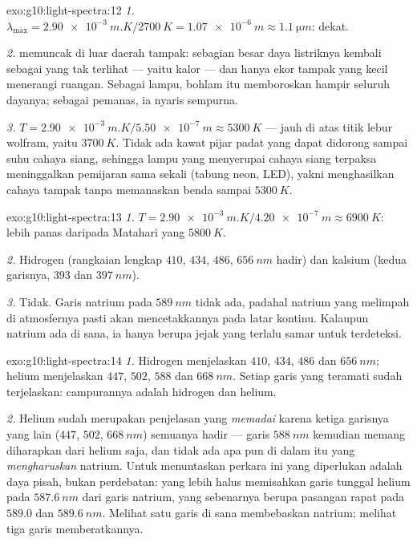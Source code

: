 \begin{solution}{exo:g10:light-spectra:12}
\emph{1.} $\lambda_{\max} = \qty{2.90e-3}{m.K} / \qty{2700}{K}
= \qty{1.07e-6}{m} \approx \qty{1.1}{\micro m}$:  dekat.

\emph{2.}  memuncak di luar daerah tampak: sebagian besar
daya listriknya kembali sebagai  yang tak terlihat --- yaitu
kalor --- dan hanya ekor tampak yang kecil menerangi ruangan. Sebagai
lampu, bohlam itu memboroskan hampir seluruh dayanya; sebagai pemanas,
ia nyaris sempurna.

\emph{3.} $T = \qty{2.90e-3}{m.K} / \qty{5.50e-7}{m} \approx
\qty{5300}{K}$ --- jauh di atas titik lebur wolfram, yaitu
$\qty{3700}{K}$. Tidak ada kawat pijar padat yang dapat didorong sampai
suhu cahaya siang, sehingga lampu yang menyerupai cahaya siang terpaksa
meninggalkan pemijaran sama sekali (tabung neon, LED), yakni
menghasilkan cahaya tampak tanpa memanaskan benda sampai
$\qty{5300}{K}$.
\end{solution}

\begin{solution}{exo:g10:light-spectra:13}
\emph{1.} $T = \qty{2.90e-3}{m.K} / \qty{4.20e-7}{m} \approx
\qty{6900}{K}$: lebih panas daripada Matahari yang $\qty{5800}{K}$.

\emph{2.} Hidrogen (rangkaian lengkap $410$, $434$, $486$,
$\qty{656}{nm}$ hadir) dan kalsium (kedua garisnya, $393$ dan
$\qty{397}{nm}$).

\emph{3.} Tidak. Garis natrium pada $\qty{589}{nm}$ tidak ada, padahal
natrium yang melimpah di atmosfernya pasti akan mencetakkannya pada
latar kontinu. Kalaupun natrium ada di sana, ia hanya berupa jejak yang
terlalu samar untuk terdeteksi.
\end{solution}

\begin{solution}{exo:g10:light-spectra:14}
\emph{1.} Hidrogen menjelaskan $410$, $434$, $486$ dan $\qty{656}{nm}$;
helium menjelaskan $447$, $502$, $588$ dan $\qty{668}{nm}$. Setiap
garis yang teramati sudah terjelaskan: campurannya adalah hidrogen dan
helium.

\emph{2.} Helium sudah merupakan penjelasan yang \emph{memadai} karena
ketiga garisnya yang lain ($447$, $502$, $\qty{668}{nm}$) semuanya
hadir --- garis $\qty{588}{nm}$ kemudian memang diharapkan dari helium
saja, dan tidak ada apa pun di dalam  itu yang
\emph{mengharuskan} natrium. Untuk menuntaskan perkara ini yang
diperlukan adalah daya pisah, bukan perdebatan:  yang lebih
halus memisahkan garis tunggal helium pada $\qty{587.6}{nm}$ dari garis
natrium, yang sebenarnya berupa pasangan rapat pada $589.0$ dan
$\qty{589.6}{nm}$. Melihat satu garis di sana membebaskan natrium;
melihat tiga garis memberatkannya.
\end{solution}

